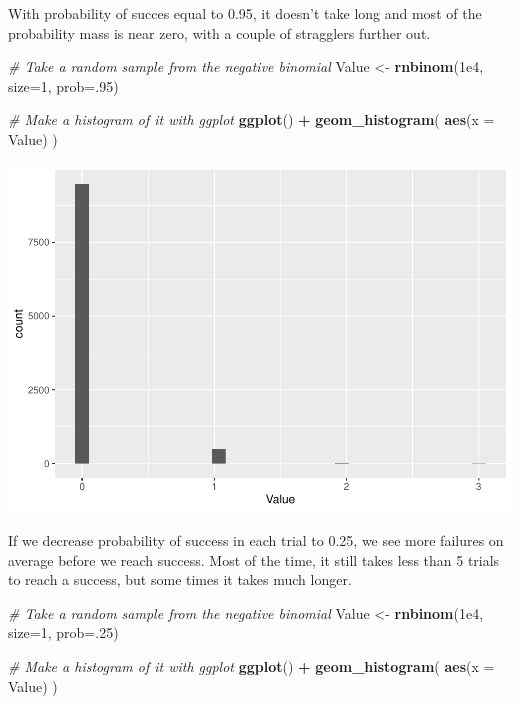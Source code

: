 \documentclass[
]{book}
\newenvironment{Shaded}{\begin{snugshade}}{\end{snugshade}}
\newcommand{\CommentTok}[1]{\textcolor[rgb]{0.56,0.35,0.01}{\textit{#1}}}
\newcommand{\DataTypeTok}[1]{\textcolor[rgb]{0.13,0.29,0.53}{#1}}
\newcommand{\DecValTok}[1]{\textcolor[rgb]{0.00,0.00,0.81}{#1}}
\newcommand{\FloatTok}[1]{\textcolor[rgb]{0.00,0.00,0.81}{#1}}
\newcommand{\KeywordTok}[1]{\textcolor[rgb]{0.13,0.29,0.53}{\textbf{#1}}}
\newcommand{\NormalTok}[1]{#1}
\newcommand{\OperatorTok}[1]{\textcolor[rgb]{0.81,0.36,0.00}{\textbf{#1}}}
\newcommand{\StringTok}[1]{\textcolor[rgb]{0.31,0.60,0.02}{#1}}
\begin{document}
With probability of succes equal to 0.95, it doesn't take long and most of the probability mass is near zero, with a couple of stragglers further out.

\begin{Shaded}
\begin{Highlighting}[]
\CommentTok{# Take a random sample from the negative binomial}
\NormalTok{Value <-}\StringTok{ }\KeywordTok{rnbinom}\NormalTok{(}\FloatTok{1e4}\NormalTok{, }\DataTypeTok{size=}\DecValTok{1}\NormalTok{, }\DataTypeTok{prob=}\NormalTok{.}\DecValTok{95}\NormalTok{)}

\CommentTok{# Make a histogram of it with ggplot}
\KeywordTok{ggplot}\NormalTok{() }\OperatorTok{+}\StringTok{ }\KeywordTok{geom_histogram}\NormalTok{( }\KeywordTok{aes}\NormalTok{(}\DataTypeTok{x =}\NormalTok{ Value) )}
\end{Highlighting}
\end{Shaded}

\includegraphics{worstr_files/figure-latex/unnamed-chunk-139-1.pdf}

If we decrease probability of success in each trial to 0.25, we see more failures on average before we reach success. Most of the time, it still takes less than 5 trials to reach a success, but some times it takes much longer.

\begin{Shaded}
\begin{Highlighting}[]
\CommentTok{# Take a random sample from the negative binomial}
\NormalTok{Value <-}\StringTok{ }\KeywordTok{rnbinom}\NormalTok{(}\FloatTok{1e4}\NormalTok{, }\DataTypeTok{size=}\DecValTok{1}\NormalTok{, }\DataTypeTok{prob=}\NormalTok{.}\DecValTok{25}\NormalTok{)}

\CommentTok{# Make a histogram of it with ggplot}
\KeywordTok{ggplot}\NormalTok{() }\OperatorTok{+}\StringTok{ }\KeywordTok{geom_histogram}\NormalTok{( }\KeywordTok{aes}\NormalTok{(}\DataTypeTok{x =}\NormalTok{ Value) )}
\end{Highlighting}
\end{Shaded}
\end{document}
